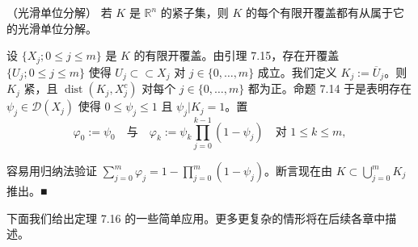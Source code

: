 \begin{theorem}

（光滑单位分解） 若 $ K $ 是 $ \mathbb{R}^{n} $ 的紧子集，则 $ K $ 的每个有限开覆盖都有从属于它的光滑单位分解。

\proofhead
设 $ \{X_{j} ; 0 \le j \le m\} $ 是 $ K $ 的有限开覆盖。由引理 7.15，存在开覆盖 $ \{U_{j} ; 0 \le j \le m\} $ 使得 $ U_{j} \subset\subset X_{j} $ 对 $ j \in \{0,\ldots,m\} $ 成立。我们定义 $ K_{j} := \overline{U}_{j} $。则 $ K_{j} $ 紧，且 $ \operatorname{dist}(K_{j},X_{j}^{c}) $ 对每个 $ j \in \{0,\ldots,m\} $ 都为正。命题 7.14 于是表明存在 $ \psi_{j} \in \mathcal{D}(X_{j}) $ 使得 $ 0 \le \psi_{j} \le 1 $ 且 $ \psi_{j}|K_{j} = 1 $。置
\[
\varphi_{0} := \psi_{0} \quad \text{与} \quad \varphi_{k} := \psi_{k}\prod_{j=0}^{k-1}(1 - \psi_{j}) \quad \text{对 } 1 \le k \le m ,
\]

容易用归纳法验证 $ \sum_{j=0}^{m}\varphi_{j} = 1 - \prod_{j=0}^{m}(1 - \psi_{j}) $。断言现在由 $ K \subset \bigcup_{j=0}^{m}K_{j} $ 推出。\nobreak\hspace{0.35em}■

\end{theorem}

下面我们给出定理 7.16 的一些简单应用。更多更复杂的情形将在后续各章中描述。

